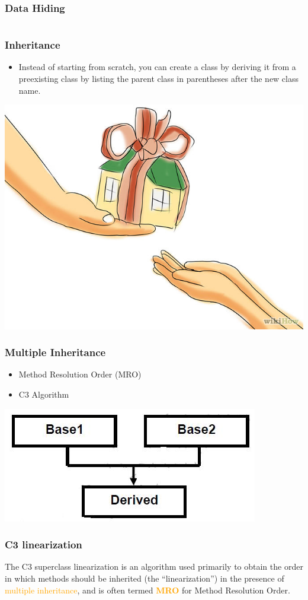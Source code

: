 \documentclass{../py-lecture}
\begin{document}
\begin{frame}[fragile]
	\frametitle{Data Hiding}
  \inputminted[bgcolor=Black,fontsize=\scriptsize]{python}{./src/secret_counter.py}
\end{frame}

\begin{frame}
	\frametitle{Inheritance}
  \begin{itemize}
    \item Instead of starting from scratch, you can create a class by deriving it
    from a preexisting class by listing the parent class in parentheses
    after the new class name.
  \end{itemize}
	\centering \includegraphics[width=.4\textwidth]{img/inheritance.jpg}
\end{frame}


\begin{frame}
	\frametitle{Multiple Inheritance}
  \begin{itemize}
    \item Method Resolution Order (MRO)
    \item C3 Algorithm
  \end{itemize}
	\centering \includegraphics[width=.3\textwidth]{img/multiple-inheritance.jpg}
\end{frame}

\begin{frame}
	\frametitle{C3 linearization}
    \begin{block}{}
        The C3 superclass linearization is an algorithm used primarily
        to obtain the order in which methods should
        be inherited (the ``linearization'') in the presence of
        \textcolor{Orange}{multiple inheritance}, and is often termed \textcolor{Orange}{\textbf{MRO}}
        for Method Resolution Order.	
			\end{block}		
\end{frame}
\end{document}
